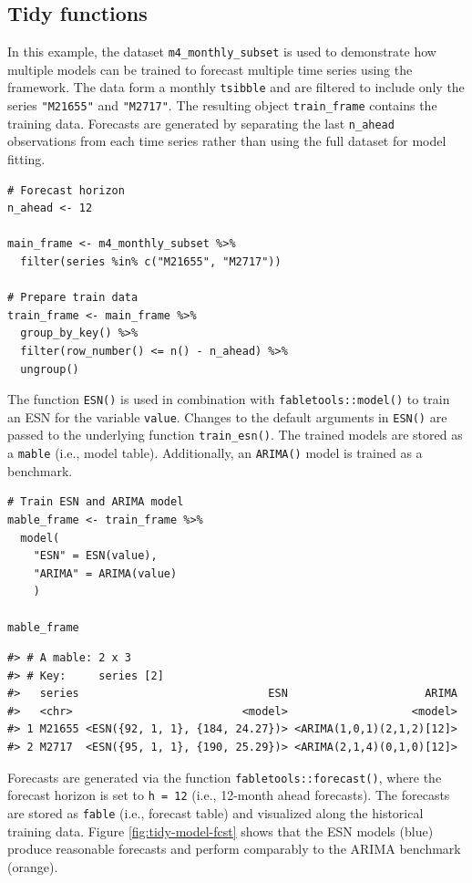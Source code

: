 \subsection{Tidy functions}\label{tidy-functions}

In this example, the dataset \texttt{m4\_monthly\_subset} is used to demonstrate how multiple models can be trained to forecast multiple time series using the  framework. The data form a monthly \texttt{tsibble} and are filtered to include only the series \texttt{"M21655"} and \texttt{"M2717"}. The resulting object \texttt{train\_frame} contains the training data. Forecasts are generated by separating the last \texttt{n\_ahead} observations from each time series rather than using the full dataset for model fitting.

\begin{verbatim}
# Forecast horizon
n_ahead <- 12

main_frame <- m4_monthly_subset %>%
  filter(series %in% c("M21655", "M2717"))

# Prepare train data
train_frame <- main_frame %>%
  group_by_key() %>%
  filter(row_number() <= n() - n_ahead) %>%
  ungroup()
\end{verbatim}

The function \texttt{ESN()} is used in combination with \texttt{fabletools::model()} to train an ESN for the variable \texttt{value}. Changes to the default arguments in \texttt{ESN()} are passed to the underlying function \texttt{train\_esn()}. The trained models are stored as a \texttt{mable} (i.e., model table). Additionally, an \texttt{ARIMA()} model is trained as a benchmark.

\begin{verbatim}
# Train ESN and ARIMA model
mable_frame <- train_frame %>%
  model(
    "ESN" = ESN(value),
    "ARIMA" = ARIMA(value)
    )

mable_frame
\end{verbatim}

\begin{verbatim}
#> # A mable: 2 x 3
#> # Key:     series [2]
#>   series                             ESN                     ARIMA
#>   <chr>                          <model>                   <model>
#> 1 M21655 <ESN({92, 1, 1}, {184, 24.27})> <ARIMA(1,0,1)(2,1,2)[12]>
#> 2 M2717  <ESN({95, 1, 1}, {190, 25.29})> <ARIMA(2,1,4)(0,1,0)[12]>
\end{verbatim}

Forecasts are generated via the function \texttt{fabletools::forecast()}, where the forecast horizon is set to \texttt{h\ =\ 12} (i.e., 12-month ahead forecasts). The forecasts are stored as \texttt{fable} (i.e., forecast table) and visualized along the historical training data. Figure \ref{fig:tidy-model-fcst} shows that the ESN models (blue) produce reasonable forecasts and perform comparably to the ARIMA benchmark (orange).

